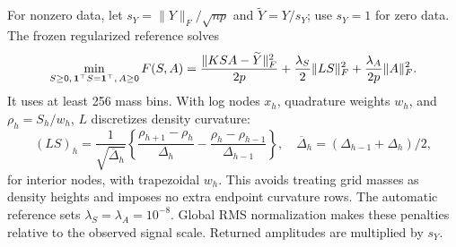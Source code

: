 For nonzero data, let $s_Y=\|Y\|_F/\sqrt{np}$ and $\widetilde Y=Y/s_Y$; use $s_Y=1$ for zero data. The frozen regularized reference solves
\begin{equation}\label{eq:mf}
 \min_{S\geq0,\,\mathbf{1}^\top S=\mathbf{1}^\top,\,A\geq0}
 F(S,A)=\frac{\|KSA-\widetilde Y\|_F^2}{2p}
 +\frac{\lambda_S}{2}\|LS\|_F^2+\frac{\lambda_A}{2p}\|A\|_F^2.
\end{equation}
It uses at least 256 mass bins. With log nodes $x_h$, quadrature weights $w_h$, and $\rho_h=S_h/w_h$, $L$ discretizes density curvature:
\begin{equation}\label{eq:mfcurvature}
 (LS)_h=\frac{1}{\sqrt{\overline\Delta_h}}
 \left\{\frac{\rho_{h+1}-\rho_h}{\Delta_h}
       -\frac{\rho_h-\rho_{h-1}}{\Delta_{h-1}}\right\},
 \quad \overline\Delta_h=(\Delta_{h-1}+\Delta_h)/2,
\end{equation}
for interior nodes, with trapezoidal $w_h$. This avoids treating grid masses as density heights and imposes no extra endpoint curvature rows. The automatic reference sets $\lambda_S=\lambda_A=10^{-8}$. Global RMS normalization makes these penalties relative to the observed signal scale. Returned amplitudes are multiplied by $s_Y$.

